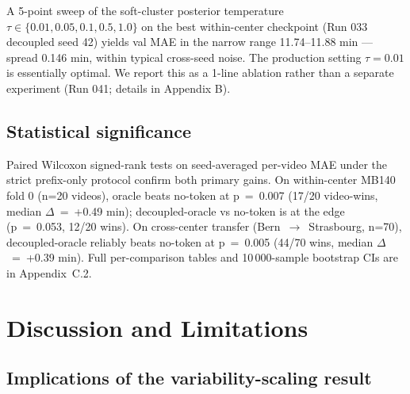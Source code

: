 A 5-point sweep of the soft-cluster posterior temperature
\(\tau \in \{0.01, 0.05, 0.1, 0.5, 1.0\}\) on the best within-center
checkpoint (Run 033 decoupled seed 42) yields val MAE in the narrow
range 11.74--11.88 min --- spread 0.146 min, within typical cross-seed
noise. The production setting \(\tau = 0.01\) is essentially optimal. We
report this as a 1-line ablation rather than a separate experiment (Run
041; details in Appendix B).

\subsection{Statistical significance}\label{statistical-significance}

Paired Wilcoxon signed-rank tests on seed-averaged per-video MAE under
the strict prefix-only protocol confirm both primary gains. On
within-center MB140 fold 0 (n=20 videos), oracle beats no-token at
p~=~0.007 (17/20 video-wins, median $\Delta$~=~+0.49 min); decoupled-oracle
vs no-token is at the edge (p~=~0.053, 12/20 wins). On cross-center
transfer (Bern~$\rightarrow$~Strasbourg, n=70), decoupled-oracle reliably beats
no-token at p~=~0.005 (44/70 wins, median $\Delta$~=~+0.39 min). Full
per-comparison tables and 10\,000-sample bootstrap CIs are in
Appendix~C.2.

\section{Discussion and Limitations}\label{discussion}\label{limitations}

\subsection{Implications of the variability-scaling result}\label{significance-what-the-variability-scaling-result-actually-buys-the-field}

